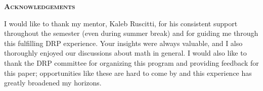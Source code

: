 {}
\begin{center}
    \textsc{\bfseries Acknowledgements}
    \\[1.5\baselineskip]
    \begin{minipage}{0.85\textwidth}
        I would like to thank my mentor, Kaleb Ruscitti, for his consistent support throughout the semester (even during summer break) and for guiding me through this fulfilling DRP experience. Your insights were always valuable, and I also thoroughly enjoyed our discussions about math in general. I would also like to thank the DRP committee for organizing this program and providing feedback for this paper; opportunities like these are hard to come by and this experience has greatly broadened my horizons.
    \end{minipage}
    \\[1\baselineskip]
    \normalem
    \printbibliography[heading=bibintoc, title={References}]
\end{center}
